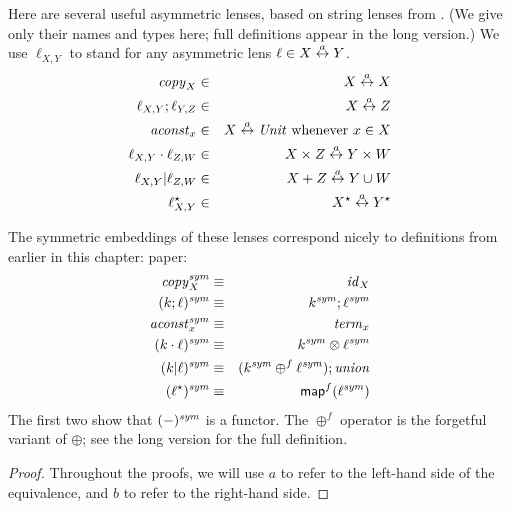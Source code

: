 \begin{defn}[$R$-similarity]
\begin{theorem}
\begin{lemma}
\begin{theorem}[No products]
\begin{lemma}
\begin{defn}
\begin{theorem}
\begin{theorem}
\begin{corollary}[Hylomorphism]
\begin{defn}
\begin{defn}
\begin{defn}[Symmetrization]
\begin{definition}
\else
Here are several useful asymmetric lenses, based on string lenses from
\cite{Boomerang07}. 
(We give only their names and types here; 
full definitions appear in the long version.) We use
$\ell_{X,Y}$ to stand for any asymmetric lens $\ell \in X \overset{a}{\leftrightarrow} Y$.
\begin{eqnarray*}
    \mathit{copy}_X &\in& X \overset{a}{\leftrightarrow} X \\
    \ell_{X,Y};\ell_{Y,Z} &\in& X \overset{a}{\leftrightarrow} Z \\
    \mathit{aconst}_x &\in& X \overset{a}{\leftrightarrow} \mathit{Unit} \mbox{ whenever } x \in X \\
    \ell_{X,Y}\cdot\ell_{Z,W} &\in& X \times Z \overset{a}{\leftrightarrow} Y \times W \\
    \ell_{X,Y}|\ell_{Z,W} &\in& X + Z \overset{a}{\leftrightarrow} Y \cup W \\
    \ell_{X,Y}^\star &\in& X^\star \overset{a}{\leftrightarrow} Y^\star
\end{eqnarray*}
\fi %
\end{definition}

\begin{theorem} The symmetric embeddings of these lenses correspond nicely
    to definitions from earlier in this \ifdissertation chapter: \else
    paper: \fi
\setcounter{equation}{0}
\begin{eqnarray}
    \mathit{copy}_X^\mathit{sym}        &\equiv& \mathit{id}_X \\
    (k;\ell)^\mathit{sym}        &\equiv& k^\mathit{sym};\ell^\mathit{sym} \\
    \mathit{aconst}_x^\mathit{sym}       &\equiv& \mathit{term}_x \\
    (k\cdot\ell)^\mathit{sym}    &\equiv& k^\mathit{sym}\otimes\ell^\mathit{sym} \\
    (k|\ell)^\mathit{sym}        &\equiv& (k^\mathit{sym} \oplus^f \ell^\mathit{sym});\mathit{union} \\
    (\ell^\star)^\mathit{sym}     &\equiv& \mathsf{map}^f(\ell^\mathit{sym})
\end{eqnarray}
The first two show that $(-)^\mathit{sym}$ is a functor. \iffull\else The $\oplus^f$ operator is
the forgetful variant of $\oplus$; see the long version for the full
definition.\fi
\end{theorem}

\iffull
\begin{proof} Throughout the proofs, we will use $a$ to refer to the
left-hand side of the equivalence, and $b$ to refer to the right-hand side.


\end{proof}
\end{defn}
\end{defn}
\end{defn}
\end{corollary}
\end{theorem}
\end{theorem}
\end{defn}
\end{lemma}
\end{theorem}
\end{lemma}
\end{theorem}
\end{defn}
